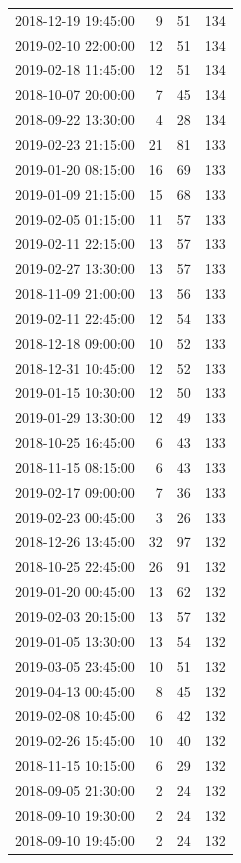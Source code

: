 \begin{tabular}{lrrr}
2018-12-19 19:45:00 & 9 & 51 & 134 \\
2019-02-10 22:00:00 & 12 & 51 & 134 \\
2019-02-18 11:45:00 & 12 & 51 & 134 \\
2018-10-07 20:00:00 & 7 & 45 & 134 \\
2018-09-22 13:30:00 & 4 & 28 & 134 \\
2019-02-23 21:15:00 & 21 & 81 & 133 \\
2019-01-20 08:15:00 & 16 & 69 & 133 \\
2019-01-09 21:15:00 & 15 & 68 & 133 \\
2019-02-05 01:15:00 & 11 & 57 & 133 \\
2019-02-11 22:15:00 & 13 & 57 & 133 \\
2019-02-27 13:30:00 & 13 & 57 & 133 \\
2018-11-09 21:00:00 & 13 & 56 & 133 \\
2019-02-11 22:45:00 & 12 & 54 & 133 \\
2018-12-18 09:00:00 & 10 & 52 & 133 \\
2018-12-31 10:45:00 & 12 & 52 & 133 \\
2019-01-15 10:30:00 & 12 & 50 & 133 \\
2019-01-29 13:30:00 & 12 & 49 & 133 \\
2018-10-25 16:45:00 & 6 & 43 & 133 \\
2018-11-15 08:15:00 & 6 & 43 & 133 \\
2019-02-17 09:00:00 & 7 & 36 & 133 \\
2019-02-23 00:45:00 & 3 & 26 & 133 \\
2018-12-26 13:45:00 & 32 & 97 & 132 \\
2018-10-25 22:45:00 & 26 & 91 & 132 \\
2019-01-20 00:45:00 & 13 & 62 & 132 \\
2019-02-03 20:15:00 & 13 & 57 & 132 \\
2019-01-05 13:30:00 & 13 & 54 & 132 \\
2019-03-05 23:45:00 & 10 & 51 & 132 \\
2019-04-13 00:45:00 & 8 & 45 & 132 \\
2019-02-08 10:45:00 & 6 & 42 & 132 \\
2019-02-26 15:45:00 & 10 & 40 & 132 \\
2018-11-15 10:15:00 & 6 & 29 & 132 \\
2018-09-05 21:30:00 & 2 & 24 & 132 \\
2018-09-10 19:30:00 & 2 & 24 & 132 \\
2018-09-10 19:45:00 & 2 & 24 & 132 \\

\end{tabular}
